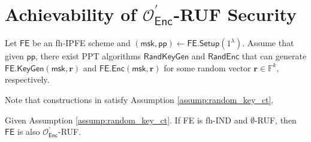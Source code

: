 \section{Achievability of $\mathcal{O}^\prime_{\textsf{Enc}}$-RUF Security}

\begin{assumption}
\label{assump:random_key_ct}

Let $\textsf{FE}$ be an fh-IPFE scheme and $(\textsf{msk}, \textsf{pp}) \gets \textsf{FE.Setup}(1^\lambda)$. Assume that given $\textsf{pp}$, there exist PPT algorithms $\textsf{RandKeyGen}$ and $\textsf{RandEnc}$ that can generate $\textsf{FE.KeyGen}(\textsf{msk}, \mathbf{r})$ and $\textsf{FE.Enc}(\textsf{msk}, \mathbf{r})$ for some random vector $\mathbf{r} \in \mathbb{F}^k$, respectively.

\end{assumption}

Note that constructions in \cite{10.1007/978-3-319-45871-7_24, cryptoeprint:2016/440} satisfy Assumption \ref{assump:random_key_ct}.

\begin{theorem}
\label{thm:fh-IPFE:ind-OEnc-ruf}
Given Assumption \ref{assump:random_key_ct}. If \textsf{FE} is fh-IND and $\emptyset$-RUF, then $\textsf{FE}$ is also $\mathcal{O}^\prime_{\textsf{Enc}}$-RUF.

\end{theorem}

